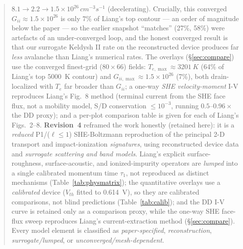 \documentclass[11pt]{article}
\begin{document}
\begin{abstract}
$8.1\!\to\!2.2\!\to\!1.5\times10^{26}\,\si{cm^{-3}s^{-1}}$ (decelerating). Crucially, this converged
$G_{ii}\approx1.5\times10^{26}$ is only $7\%$ of Liang's top contour --- an order of magnitude below
the paper --- so the earlier snapshot ``matches'' (27\%, 58\%) were artefacts of an under-converged
loop, and the honest converged result is that our surrogate Keldysh II rate on the reconstructed
device produces far \emph{less} avalanche than Liang's numerical rates. The overlays
(\S\ref{sec:compare}) use the converged finest-grid ($80{\times}66$) fields:
$T_{e,\max}\approx\SI{3201}{K}$ (64\% of Liang's top \SI{5000}{K} contour) and
$G_{ii,\max}\approx1.5\times10^{26}$ (7\%), both drain-localized with $T_e$ far broader than
$G_{ii}$; a one-way \emph{SHE velocity-moment} I-V reproduces Liang's Fig.~8 method (terminal current
from the SHE face flux, not a mobility model, S/D conservation $\le10^{-3}$, running
$0.5$--$0.96\times$ the DD proxy); and a per-plot comparison table is given for each of Liang's
Figs.~2--8.
\textbf{Revision~4} reframed the work honestly (retained here): it
is a \emph{reduced} P1/($\ell\le1$) SHE-Boltzmann reproduction of the principal 2-D transport and
impact-ionization \emph{signatures}, using reconstructed device data and \emph{surrogate scattering
and band models}. Liang's explicit surface-roughness, surface-acoustic, and ionized-impurity
operators are \emph{lumped} into a single calibrated momentum time $\tau_1$, not reproduced as
distinct mechanisms (Table~\ref{tab:physmatrix}); the quantitative overlays use a \emph{calibrated}
device ($V_{th}$ fitted to \SI{0.614}{V}), so they are calibrated comparisons, not blind
predictions (Table~\ref{tab:calib}); and the DD I-V curve is retained only as a comparison proxy,
while the one-way SHE face-flux sweep reproduces Liang's current-extraction method
(\S\ref{sec:compare}). Every model element is classified as \emph{paper-specified},
\emph{reconstruction}, \emph{surrogate/lumped}, or \emph{unconverged/mesh-dependent}.
\end{abstract}

\tableofcontents
\end{document}
